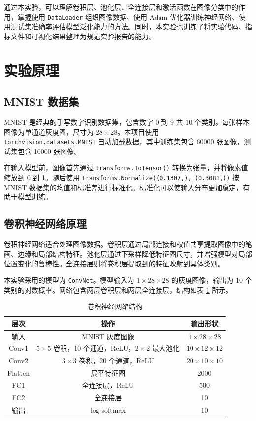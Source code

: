 \documentclass[UTF8,a4paper,10pt]{ctexart}
\begin{document}
通过本实验，可以理解卷积层、池化层、全连接层和激活函数在图像分类中的作用，掌握使用 \texttt{DataLoader} 组织图像数据、使用 Adam 优化器训练神经网络、使用测试集准确率评估模型泛化能力的方法。同时，本实验也训练了将实验代码、指标文件和可视化结果整理为规范实验报告的能力。

\section{实验原理}
\subsection{MNIST 数据集}
MNIST 是经典的手写数字识别数据集，包含数字 0 到 9 共 10 个类别。每张样本图像为单通道灰度图，尺寸为 $28\times28$。本项目使用 \texttt{torchvision.datasets.MNIST} 自动加载数据，其中训练集包含 60000 张图像，测试集包含 10000 张图像。

在输入模型前，图像首先通过 \texttt{transforms.ToTensor()} 转换为张量，并将像素值缩放到 0 到 1。随后使用 \texttt{transforms.Normalize((0.1307,), (0.3081,))} 按 MNIST 数据集的均值和标准差进行标准化。标准化可以使输入分布更加稳定，有助于模型训练。

\subsection{卷积神经网络原理}
卷积神经网络适合处理图像数据。卷积层通过局部连接和权值共享提取图像中的笔画、边缘和局部结构特征。池化层通过下采样降低特征图尺寸，并增强模型对局部位置变化的鲁棒性。全连接层则将卷积层提取到的特征映射到具体类别。

本实验采用的模型为 \texttt{ConvNet}。模型输入为 $1\times28\times28$ 的灰度图像，输出为 10 个类别的对数概率。网络包含两层卷积层和两层全连接层，结构如表 \ref{tab:model} 所示。

\begin{table}[!htbp]
  \centering
  \begin{tabular}{ccc}
  \toprule
  层次 & 操作 & 输出形状\\
  \midrule
  输入 & MNIST 灰度图像 & $1\times28\times28$\\
  Conv1 & $5\times5$ 卷积，10 个通道，ReLU，$2\times2$ 最大池化 & $10\times12\times12$\\
  Conv2 & $3\times3$ 卷积，20 个通道，ReLU & $20\times10\times10$\\
  Flatten & 展平特征图 & 2000\\
  FC1 & 全连接层，ReLU & 500\\
  FC2 & 全连接层 & 10\\
  输出 & log softmax & 10\\
  \bottomrule
  \end{tabular}
  \caption{卷积神经网络结构}
  \label{tab:model}
\end{table}
\end{document}
